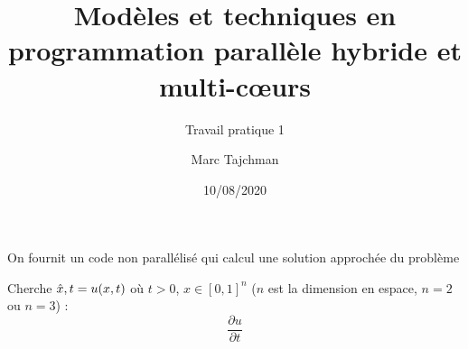 \documentclass{beamer}
\title{Modèles et techniques en programmation parallèle hybride et multi-c\oe urs}
\subtitle{Travail pratique 1}
\author{Marc Tajchman}\institute{CEA - DEN/DM2S/STMF/LMES}
\date{10/08/2020}
\def\Frac#1#2{\frac{\displaystyle #1}{\displaystyle #2}}
\begin{document}
\begin{frame}
	\titlepage
\end{frame}

\large
\begin{frame}
	On fournit un code non parallélisé qui calcul une solution approchée du problème
	
	Cherche $\hat{x}, t = u(\boldmath{x}, t)$ où $t > 0$, $\hat{x} \in [0,1]^n$ ($n$ est la dimension en espace, $n=2$ ou $n=3$) : 
	$$
	\Frac{\partial u}{\partial t}
	$$
\end{frame}
\end{document}
